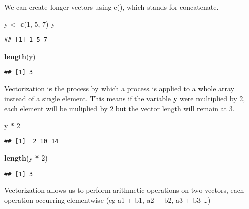\documentclass[]{article}
\newenvironment{Shaded}{\begin{snugshade}}{\end{snugshade}}
\newcommand{\KeywordTok}[1]{\textcolor[rgb]{0.13,0.29,0.53}{\textbf{#1}}}
\newcommand{\DecValTok}[1]{\textcolor[rgb]{0.00,0.00,0.81}{#1}}
\newcommand{\StringTok}[1]{\textcolor[rgb]{0.31,0.60,0.02}{#1}}
\newcommand{\OperatorTok}[1]{\textcolor[rgb]{0.81,0.36,0.00}{\textbf{#1}}}
\newcommand{\NormalTok}[1]{#1}
\begin{document}
We can create longer vectors using c(), which stands for concatenate.

\begin{Shaded}
\begin{Highlighting}[]
\NormalTok{y <-}\StringTok{ }\KeywordTok{c}\NormalTok{(}\DecValTok{1}\NormalTok{, }\DecValTok{5}\NormalTok{, }\DecValTok{7}\NormalTok{)}
\NormalTok{y}
\end{Highlighting}
\end{Shaded}

\begin{verbatim}
## [1] 1 5 7
\end{verbatim}

\begin{Shaded}
\begin{Highlighting}[]
\KeywordTok{length}\NormalTok{(y)}
\end{Highlighting}
\end{Shaded}

\begin{verbatim}
## [1] 3
\end{verbatim}

Vectorization is the process by which a process is applied to a whole
array instead of a single element. This means if the variable \textbf{y}
were multiplied by 2, each element will be muliplied by 2 but the vector
length will remain at 3.

\begin{Shaded}
\begin{Highlighting}[]
\NormalTok{y }\OperatorTok{*}\StringTok{ }\DecValTok{2}
\end{Highlighting}
\end{Shaded}

\begin{verbatim}
## [1]  2 10 14
\end{verbatim}

\begin{Shaded}
\begin{Highlighting}[]
\KeywordTok{length}\NormalTok{(y }\OperatorTok{*}\StringTok{ }\DecValTok{2}\NormalTok{)}
\end{Highlighting}
\end{Shaded}

\begin{verbatim}
## [1] 3
\end{verbatim}

Vectorization allows us to perform arithmetic operations on two vectors,
each operation occurring elementwise (eg a1 + b1, a2 + b2, a3 + b3
\ldots{})
\end{document}
